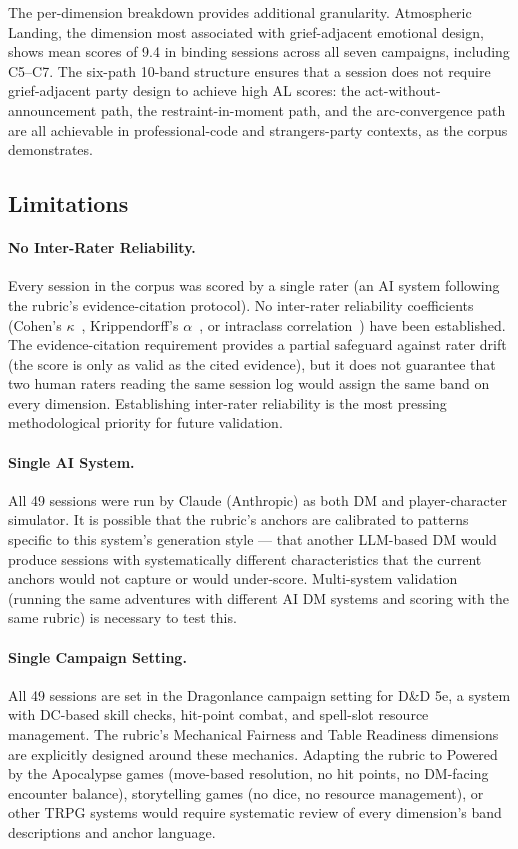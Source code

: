 The per-dimension breakdown provides additional granularity. Atmospheric Landing, the
dimension most associated with grief-adjacent emotional design, shows mean scores of
9.4 in binding sessions across all seven campaigns, including C5--C7. The six-path
10-band structure ensures that a session does not require grief-adjacent party design
to achieve high AL scores: the act-without-announcement path, the restraint-in-moment
path, and the arc-convergence path are all achievable in professional-code and
strangers-party contexts, as the corpus demonstrates.

\subsection{Limitations}

\paragraph{No Inter-Rater Reliability.}
Every session in the corpus was scored by a single rater (an AI system following the
rubric's evidence-citation protocol). No inter-rater reliability coefficients
(Cohen's $\kappa$~\cite{cohen1960coefficient}, Krippendorff's $\alpha$~\cite{krippendorff2011computing},
or intraclass correlation~\cite{shrout1979intraclass}) have been established. The
evidence-citation requirement provides a partial safeguard against rater drift (the
score is only as valid as the cited evidence), but it does not guarantee that two
human raters reading the same session log would assign the same band on every
dimension. Establishing inter-rater reliability is the most pressing methodological
priority for future validation.

\paragraph{Single AI System.}
All 49 sessions were run by Claude (Anthropic) as both DM and player-character
simulator. It is possible that the rubric's anchors are calibrated to patterns
specific to this system's generation style --- that another LLM-based DM would produce
sessions with systematically different characteristics that the current anchors
would not capture or would under-score. Multi-system validation (running the same
adventures with different AI DM systems and scoring with the same rubric) is necessary
to test this.

\paragraph{Single Campaign Setting.}
All 49 sessions are set in the Dragonlance campaign setting for D\&D 5e, a system
with DC-based skill checks, hit-point combat, and spell-slot resource management. The
rubric's Mechanical Fairness and Table Readiness dimensions are explicitly designed
around these mechanics. Adapting the rubric to Powered by the Apocalypse games (move-based
resolution, no hit points, no DM-facing encounter balance), storytelling games (no dice,
no resource management), or other TRPG systems would require systematic review of every
dimension's band descriptions and anchor language.

